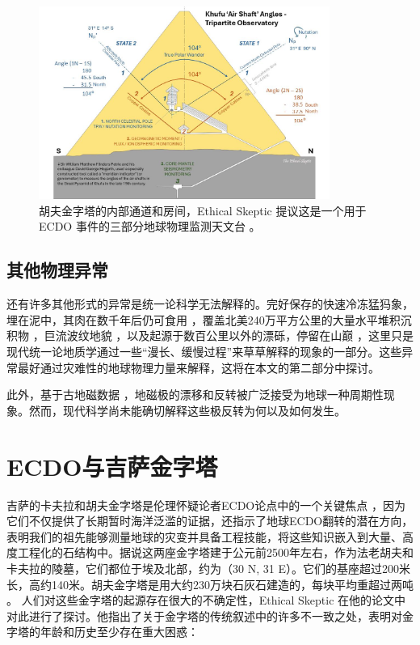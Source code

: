 \documentclass[10pt,twocolumn,letterpaper]{article}
\begin{document}
\begin{figure}[t]
\begin{center}
\includegraphics[width=0.85\textwidth]{shafts.jpg}
\end{center}
   \caption{胡夫金字塔的内部通道和房间，Ethical Skeptic 提议这是一个用于 ECDO 事件的三部分地球物理监测天文台 \cite{28}。}
\label{fig:5}
\end{figure}

\subsection{其他物理异常}

还有许多其他形式的异常是统一论科学无法解释的。完好保存的快速冷冻猛犸象，埋在泥中，其肉在数千年后仍可食用 \cite{17,18,19}，覆盖北美240万平方公里的大量水平堆积沉积物 \cite{21}，巨流波纹地貌 \cite{22}，以及起源于数百公里以外的漂砾，停留在山巅 \cite{23,26}，这里只是现代统一论地质学通过一些“漫长、缓慢过程”来草草解释的现象的一部分。这些异常最好通过灾难性的地球物理力量来解释，这将在本文的第二部分中探讨。

此外，基于古地磁数据 \cite{35,40,41}，地磁极的漂移和反转被广泛接受为地球一种周期性现象。然而，现代科学尚未能确切解释这些极反转为何以及如何发生。

\section{ECDO与吉萨金字塔}

吉萨的卡夫拉和胡夫金字塔是伦理怀疑论者ECDO论点中的一个关键焦点 \cite{27}，因为它们不仅提供了长期暂时海洋泛滥的证据，还指示了地球ECDO翻转的潜在方向，表明我们的祖先能够测量地球的灾变并具备工程技能，将这些知识嵌入到大量、高度工程化的石结构中。据说这两座金字塔建于公元前2500年左右，作为法老胡夫和卡夫拉的陵墓，它们都位于埃及北部，约为（30 N, 31 E）。它们的基座超过200米长，高约140米。胡夫金字塔是用大约230万块石灰石建造的，每块平均重超过两吨 \cite{24, 25}。
人们对这些金字塔的起源存在很大的不确定性，Ethical Skeptic 在他的论文中对此进行了探讨。他指出了关于金字塔的传统叙述中的许多不一致之处，表明对金字塔的年龄和历史至少存在重大困惑：
\end{document}
